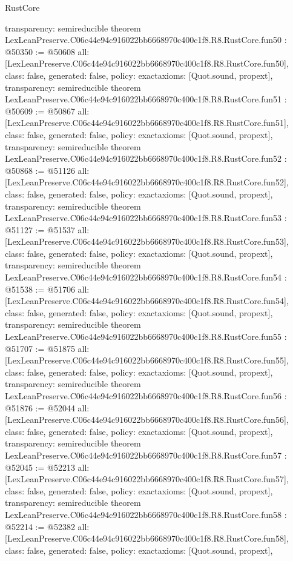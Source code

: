 \begin{lexlean}{RustCore}
\begin{coremodule}
{  transparency: semireducible
}
theorem LexLeanPreserve.C06c44e94c916022bb6668970c400c1f8.R8.RustCore.fun50 : @50350 := @50608 {
  all: [LexLeanPreserve.C06c44e94c916022bb6668970c400c1f8.R8.RustCore.fun50],
  class: false,
  generated: false,
  policy: exact{axioms: [Quot.sound, propext]},
  transparency: semireducible
}
theorem LexLeanPreserve.C06c44e94c916022bb6668970c400c1f8.R8.RustCore.fun51 : @50609 := @50867 {
  all: [LexLeanPreserve.C06c44e94c916022bb6668970c400c1f8.R8.RustCore.fun51],
  class: false,
  generated: false,
  policy: exact{axioms: [Quot.sound, propext]},
  transparency: semireducible
}
theorem LexLeanPreserve.C06c44e94c916022bb6668970c400c1f8.R8.RustCore.fun52 : @50868 := @51126 {
  all: [LexLeanPreserve.C06c44e94c916022bb6668970c400c1f8.R8.RustCore.fun52],
  class: false,
  generated: false,
  policy: exact{axioms: [Quot.sound, propext]},
  transparency: semireducible
}
theorem LexLeanPreserve.C06c44e94c916022bb6668970c400c1f8.R8.RustCore.fun53 : @51127 := @51537 {
  all: [LexLeanPreserve.C06c44e94c916022bb6668970c400c1f8.R8.RustCore.fun53],
  class: false,
  generated: false,
  policy: exact{axioms: [Quot.sound, propext]},
  transparency: semireducible
}
theorem LexLeanPreserve.C06c44e94c916022bb6668970c400c1f8.R8.RustCore.fun54 : @51538 := @51706 {
  all: [LexLeanPreserve.C06c44e94c916022bb6668970c400c1f8.R8.RustCore.fun54],
  class: false,
  generated: false,
  policy: exact{axioms: [Quot.sound, propext]},
  transparency: semireducible
}
theorem LexLeanPreserve.C06c44e94c916022bb6668970c400c1f8.R8.RustCore.fun55 : @51707 := @51875 {
  all: [LexLeanPreserve.C06c44e94c916022bb6668970c400c1f8.R8.RustCore.fun55],
  class: false,
  generated: false,
  policy: exact{axioms: [Quot.sound, propext]},
  transparency: semireducible
}
theorem LexLeanPreserve.C06c44e94c916022bb6668970c400c1f8.R8.RustCore.fun56 : @51876 := @52044 {
  all: [LexLeanPreserve.C06c44e94c916022bb6668970c400c1f8.R8.RustCore.fun56],
  class: false,
  generated: false,
  policy: exact{axioms: [Quot.sound, propext]},
  transparency: semireducible
}
theorem LexLeanPreserve.C06c44e94c916022bb6668970c400c1f8.R8.RustCore.fun57 : @52045 := @52213 {
  all: [LexLeanPreserve.C06c44e94c916022bb6668970c400c1f8.R8.RustCore.fun57],
  class: false,
  generated: false,
  policy: exact{axioms: [Quot.sound, propext]},
  transparency: semireducible
}
theorem LexLeanPreserve.C06c44e94c916022bb6668970c400c1f8.R8.RustCore.fun58 : @52214 := @52382 {
  all: [LexLeanPreserve.C06c44e94c916022bb6668970c400c1f8.R8.RustCore.fun58],
  class: false,
  generated: false,
  policy: exact{axioms: [Quot.sound, propext]},
}
\end{coremodule}
\end{lexlean}
